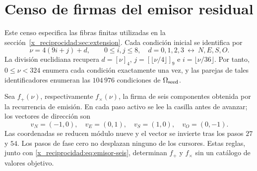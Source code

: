 \chapter{Censo de firmas del emisor residual}
\label{x_reciprocidad:app:firmas-emision}

Este censo especifica las fibras finitas utilizadas en la sección~\ref{x_reciprocidad:sec:extension}.
Cada condición inicial se identifica por
\[
 \nu=4(9i+j)+d,\qquad 0\leq i,j\leq8,\quad
 d=0,1,2,3\ \longleftrightarrow\ N,E,S,O.
\]
La división euclidiana recupera \(d=[\nu]_4\), \(j=[\lfloor\nu/4\rfloor]_9\)
e \(i=\lfloor\nu/36\rfloor\). Por tanto, \(0\leq\nu<324\) enumera
cada condición exactamente una vez, y las parejas de tales identificadores
enumeran las \(104\,976\) condiciones de \(\Omega_{\rm seed}\).

Sea \(f_+(\nu)\), respectivamente \(f_\times(\nu)\), la firma de seis
componentes obtenida por la recurrencia de emisión. En cada paso activo se lee
la casilla antes de avanzar; los vectores de dirección son
\[
 v_N=(-1,0),\quad v_E=(0,1),\quad v_S=(1,0),\quad v_O=(0,-1).
\]
Las coordenadas se reducen módulo nueve y el vector se invierte tras los
pasos \(27\) y \(54\). Los pasos de fase cero no desplazan ninguno de los
cursores. Estas reglas, junto con \eqref{x_reciprocidad:eq:emisor-seis}, determinan
\(f_+\) y \(f_\times\) sin un catálogo de valores objetivo.

